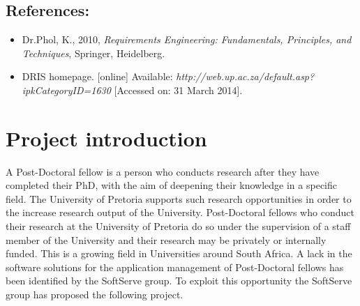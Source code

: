 \documentclass[12pt]{article}
\begin{document}
\vspace{0.2in}

\subsection{References:}
\vspace{0.1in}
\begin{itemize}
\item Dr.Phol, K., 2010, \textit{Requirements Engineering: Fundamentals, Principles, and Techniques}, Springer, Heidelberg.
\item DRIS homepage. [online] Available: \textit{http://web.up.ac.za/default.asp?ipkCategoryID=1630} [Accessed on: 31 March 2014].
\end{itemize}	

\vspace{0.5in}

\newpage
\section{Project introduction}
A Post-Doctoral fellow is a person who conducts research after they have completed their PhD, with the aim of deepening their knowledge in a specific field. The University of Pretoria supports such research opportunities in order to the increase research output of the University. Post-Doctoral fellows who conduct their research at the University of Pretoria do so under the supervision of a staff member of the University and their research may be privately or internally funded. This is a growing field in Universities around South Africa. A lack in the software solutions for the application management of Post-Doctoral fellows has been identified by the SoftServe group. To exploit this opportunity the SoftServe group has proposed the following project.
 
\vspace{0.2in}
\end{document}

